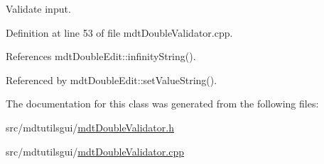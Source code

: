 Validate input. 



Definition at line 53 of file mdt\-Double\-Validator.\-cpp.



References mdt\-Double\-Edit\-::infinity\-String().



Referenced by mdt\-Double\-Edit\-::set\-Value\-String().



The documentation for this class was generated from the following files\-:\begin{DoxyCompactItemize}
\item 
src/mdtutilsgui/\hyperlink{mdt_double_validator_8h}{mdt\-Double\-Validator.\-h}\item 
src/mdtutilsgui/\hyperlink{mdt_double_validator_8cpp}{mdt\-Double\-Validator.\-cpp}\end{DoxyCompactItemize}
